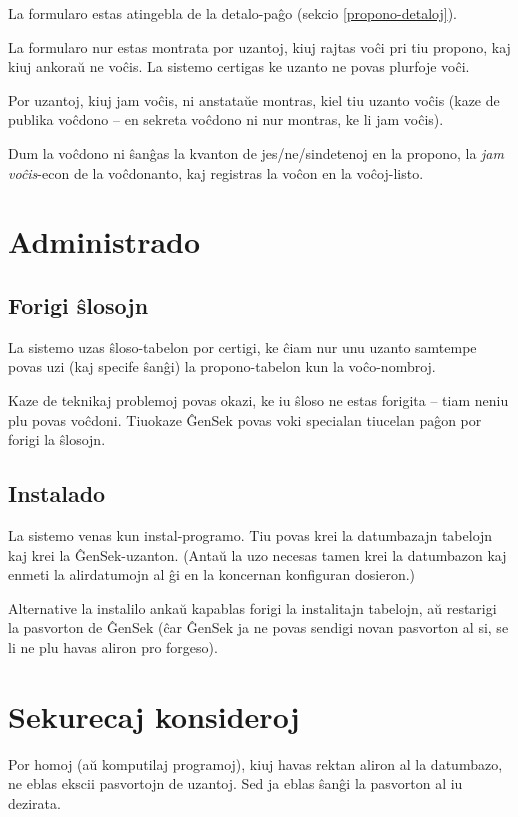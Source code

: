\documentclass[draft]{scrartcl}
\begin{document}
La formularo estas atingebla de la detalo-paĝo
(sekcio \ref{propono-detaloj}).

La formularo nur estas montrata por uzantoj, kiuj rajtas voĉi
pri tiu propono, kaj kiuj ankoraŭ ne voĉis. La sistemo certigas
ke uzanto ne povas plurfoje voĉi.

Por uzantoj, kiuj jam voĉis, ni anstataŭe montras, kiel
tiu uzanto voĉis (kaze de publika voĉdono -- en sekreta voĉdono
ni nur montras, ke li jam voĉis).

Dum la voĉdono ni ŝanĝas la kvanton de jes/ne/sindetenoj en la
propono, la \emph{jam voĉis}-econ de la voĉdonanto, kaj registras
la voĉon en la voĉoj-listo.

\section{Administrado}

\subsection{Forigi ŝlosojn}

La sistemo uzas ŝloso-tabelon por certigi, ke ĉiam nur unu uzanto samtempe
povas uzi (kaj specife ŝanĝi) la propono-tabelon kun la voĉo-nombroj.

Kaze de teknikaj problemoj povas okazi, ke iu ŝloso ne estas forigita --
tiam neniu plu povas voĉdoni. Tiuokaze ĜenSek povas voki specialan
tiucelan paĝon por forigi la ŝlosojn.

\subsection{Instalado}

La sistemo venas kun instal-programo. Tiu povas krei la datumbazajn
tabelojn kaj krei la ĜenSek-uzanton. (Antaŭ la uzo necesas tamen
krei la datumbazon kaj enmeti la alirdatumojn al ĝi en la koncernan
konfiguran dosieron.)

Alternative la instalilo ankaŭ kapablas forigi la instalitajn tabelojn, aŭ
restarigi la pasvorton de ĜenSek (ĉar ĜenSek ja ne povas sendigi novan
pasvorton al si, se li ne plu havas aliron pro forgeso).


\section{Sekurecaj konsideroj}

Por homoj (aŭ komputilaj programoj), kiuj havas rektan aliron
al la datumbazo, ne eblas ekscii pasvortojn de uzantoj. Sed ja eblas
ŝanĝi la pasvorton al iu dezirata. %
\end{document}
